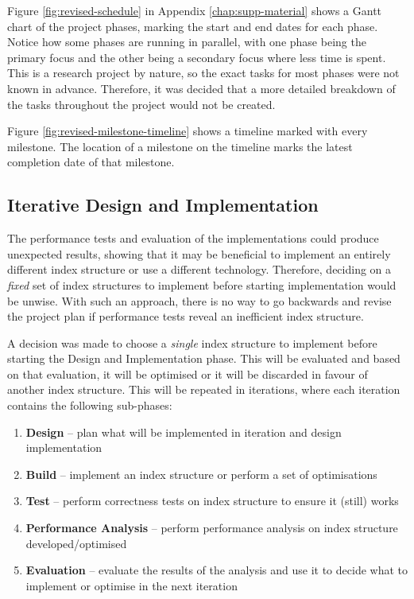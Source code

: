 Figure \ref{fig:revised-schedule} in Appendix \ref{chap:supp-material} shows a Gantt chart of the project phases, marking the start and end dates for each phase. Notice how some phases are running in parallel, with one phase being the primary focus and the other being a secondary focus where less time is spent. This is a research project by nature, so the exact tasks for most phases were not known in advance. Therefore, it was decided that a more detailed breakdown of the tasks throughout the project would not be created.

Figure \ref{fig:revised-milestone-timeline} shows a timeline marked with every milestone. The location of a milestone on the timeline marks the latest completion date of that milestone.

\subsection{Iterative Design and Implementation}
\label{sec:iterative-d-and-i}

The performance tests and evaluation of the implementations could produce unexpected results, showing that it may be beneficial to implement an entirely different index structure or use a different technology. Therefore, deciding on a \textit{fixed} set of index structures to implement before starting implementation would be unwise. With such an approach, there is no way to go backwards and revise the project plan if performance tests reveal an inefficient index structure.

A decision was made to choose a \textit{single} index structure to implement before starting the Design and Implementation phase. This will be evaluated and based on that evaluation, it will be optimised or it will be discarded in favour of another index structure. This will be repeated in iterations, where each iteration contains the following sub-phases:
\begin{enumerate}
	\item \textbf{Design} -- plan what will be implemented in iteration and design implementation
	\item \textbf{Build} -- implement an index structure or perform a set of optimisations
	\item \textbf{Test} -- perform correctness tests on index structure to ensure it (still) works
	\item \textbf{Performance Analysis} -- perform performance analysis on index structure developed/optimised
	\item \textbf{Evaluation} -- evaluate the results of the analysis and use it to decide what to implement or optimise in the next iteration
\end{enumerate}

